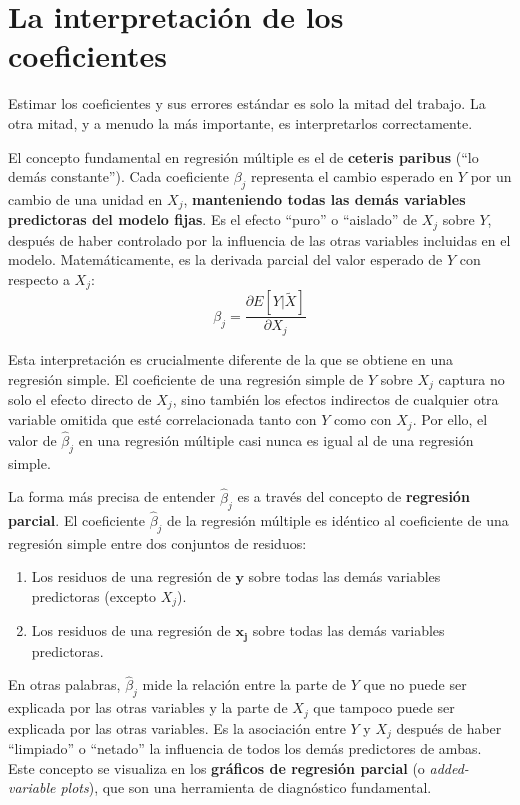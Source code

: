 \documentclass[
  letterpaper,
  DIV=11,
  numbers=noendperiod]{scrreprt}
\providecommand{\tightlist}{%
  \setlength{\itemsep}{0pt}\setlength{\parskip}{0pt}}
\begin{document}
\section{La interpretación de los
coeficientes}\label{la-interpretaciuxf3n-de-los-coeficientes}

Estimar los coeficientes y sus errores estándar es solo la mitad del
trabajo. La otra mitad, y a menudo la más importante, es interpretarlos
correctamente.

El concepto fundamental en regresión múltiple es el de \textbf{ceteris
paribus} (``lo demás constante''). Cada coeficiente \(\beta_j\)
representa el cambio esperado en \(Y\) por un cambio de una unidad en
\(X_j\), \textbf{manteniendo todas las demás variables predictoras del
modelo fijas}. Es el efecto ``puro'' o ``aislado'' de \(X_j\) sobre
\(Y\), después de haber controlado por la influencia de las otras
variables incluidas en el modelo. Matemáticamente, es la derivada
parcial del valor esperado de \(Y\) con respecto a \(X_j\):
\[\beta_j = \frac{\partial E[Y|\tilde{X}]}{\partial X_j}\]

Esta interpretación es crucialmente diferente de la que se obtiene en
una regresión simple. El coeficiente de una regresión simple de \(Y\)
sobre \(X_j\) captura no solo el efecto directo de \(X_j\), sino también
los efectos indirectos de cualquier otra variable omitida que esté
correlacionada tanto con \(Y\) como con \(X_j\). Por ello, el valor de
\(\hat{\beta}_j\) en una regresión múltiple casi nunca es igual al de
una regresión simple.

La forma más precisa de entender \(\hat{\beta}_j\) es a través del
concepto de \textbf{regresión parcial}. El coeficiente \(\hat{\beta}_j\)
de la regresión múltiple es idéntico al coeficiente de una regresión
simple entre dos conjuntos de residuos:

\begin{enumerate}
\def\labelenumi{\arabic{enumi}.}
\tightlist
\item
  Los residuos de una regresión de \(\mathbf{y}\) sobre todas las demás
  variables predictoras (excepto \(X_j\)).
\item
  Los residuos de una regresión de \(\mathbf{x_j}\) sobre todas las
  demás variables predictoras.
\end{enumerate}

En otras palabras, \(\hat{\beta}_j\) mide la relación entre la parte de
\(Y\) que no puede ser explicada por las otras variables y la parte de
\(X_j\) que tampoco puede ser explicada por las otras variables. Es la
asociación entre \(Y\) y \(X_j\) después de haber ``limpiado'' o
``netado'' la influencia de todos los demás predictores de ambas. Este
concepto se visualiza en los \textbf{gráficos de regresión parcial} (o
\emph{added-variable plots}), que son una herramienta de diagnóstico
fundamental.
\end{document}

